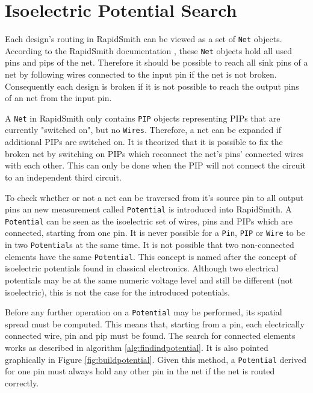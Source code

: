 \section{Isoelectric Potential Search}
\label{sec:isolectricelements}

Each design's routing in RapidSmith can be viewed as a set of \texttt{Net} objects. According to the RapidSmith documentation \cite{techDoc}, these \texttt{Net} objects hold all used pins and pips of the net.
Therefore it should be possible to reach all sink pins of a net by following wires connected to the input pin if the net is not broken.
Consequently each design is broken if it is not possible to reach the output pins of an net from the input pin.  

A \texttt{Net} in RapidSmith only contains \texttt{PIP} objects representing PIPs that are currently "switched on", but no \texttt{Wires}. Therefore, a net can be expanded if additional PIPs are switched on. 
It is theorized that it is possible to fix the broken net by switching on PIPs which reconnect the net's pins' connected wires with each other. This can only be done when the PIP will not connect the circuit to an independent third circuit.

To check whether or not a net can be traversed from it's source pin to all output pins an new measurement called \texttt{Potential} is introduced into RapidSmith.
A \texttt{Potential} can be seen as the isoelectric set of wires, pins and PIPs which are connected, starting from one pin.
It is never possible for a \texttt{Pin}, \texttt{PIP} or \texttt{Wire} to be in two \texttt{Potential}s at the same time. It is not possible that two non-connected elements have the same \texttt{Potential}. 
This concept is named after the concept of isoelectric potentials found in classical electronics. Although two electrical potentials may be at the same numeric voltage level and still be different (not isoelectric), this is not the case for the introduced potentials.

Before any further operation on a \texttt{Potential} may be performed, its spatial spread must be computed. This means that, starting from a pin, each electrically connected wire, pin and pip must be found. The search for connected elements works as described in algorithm \ref{alg:findindpotential}. It is also pointed graphically in Figure \ref{fig:buildpotential}. Given this method, a \texttt{Potential} derived for one pin must always hold any other pin in the net if the net is routed correctly.

